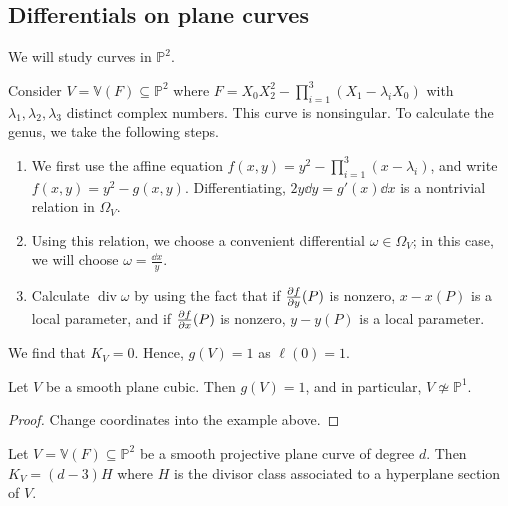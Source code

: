 \subsection{Differentials on plane curves}
We will study curves in \( \mathbb P^2 \).
\begin{example}
    Consider \( V = \mathbb V(F) \subseteq \mathbb P^2 \) where \( F = X_0 X_2^2 - \prod_{i=1}^3 (X_1 - \lambda_i X_0) \) with \( \lambda_1, \lambda_2, \lambda_3 \) distinct complex numbers.
    This curve is nonsingular.
    To calculate the genus, we take the following steps.
    \begin{enumerate}
        \item We first use the affine equation \( f(x,y) = y^2 - \prod_{i=1}^3 (x - \lambda_i) \), and write \( f(x,y) = y^2 - g(x,y) \).
        Differentiating, \( 2y \dd{y} = g'(x) \dd{x} \) is a nontrivial relation in \( \Omega_V \).
        \item Using this relation, we choose a convenient differential \( \omega \in \Omega_V \); in this case, we will choose \( \omega = \frac{\dd{x}}{y} \).
        \item Calculate \( \operatorname{div}\omega \) by using the fact that if \( \pdv{f}{y}\qty(P) \) is nonzero, \( x - x(P) \) is a local parameter, and if \( \pdv{f}{x}\qty(P) \) is nonzero, \( y - y(P) \) is a local parameter.
    \end{enumerate}
    We find that \( K_V = 0 \).
    Hence, \( g(V) = 1 \) as \( \ell(0) = 1 \).
\end{example}
\begin{theorem}
    Let \( V \) be a smooth plane cubic.
    Then \( g(V) = 1 \), and in particular, \( V \not\simeq \mathbb P^1 \).
\end{theorem}
\begin{proof}
    Change coordinates into the example above.
\end{proof}
\begin{theorem}
    Let \( V = \mathbb V(F) \subseteq \mathbb P^2 \) be a smooth projective plane curve of degree \( d \).
    Then \( K_V = (d - 3)H \) where \( H \) is the divisor class associated to a hyperplane section of \( V \).
\end{theorem}
